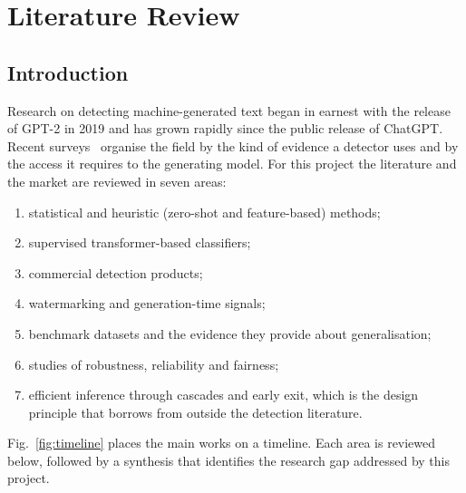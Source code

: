 \chapter{Literature Review}
\label{ch:lit}

\section{Introduction}

Research on detecting machine-generated text began in earnest with the
release of GPT-2 in 2019 and has grown rapidly since the public release of
ChatGPT. Recent surveys~\cite{tang2024science,wu2025survey} organise the field
by the kind of evidence a detector uses and by the access it requires to the
generating model. For this project the literature and the market are reviewed
in seven areas:
\begin{enumerate}
  \item statistical and heuristic (zero-shot and feature-based) methods;
  \item supervised transformer-based classifiers;
  \item commercial detection products;
  \item watermarking and generation-time signals;
  \item benchmark datasets and the evidence they provide about generalisation;
  \item studies of robustness, reliability and fairness;
  \item efficient inference through cascades and early exit, which is the
        design principle that \veriscript{} borrows from outside the
        detection literature.
\end{enumerate}
Fig.~\ref{fig:timeline} places the main works on a timeline. Each area is
reviewed below, followed by a synthesis that identifies the research gap
addressed by this project.

